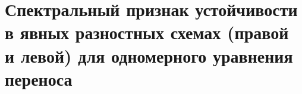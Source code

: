 \documentclass[__main__.tex]{subfiles}
\begin{document}
\section{Спектральный признак устойчивости в явных разностных схемах (правой и левой) для одномерного уравнения переноса}
\end{document}
